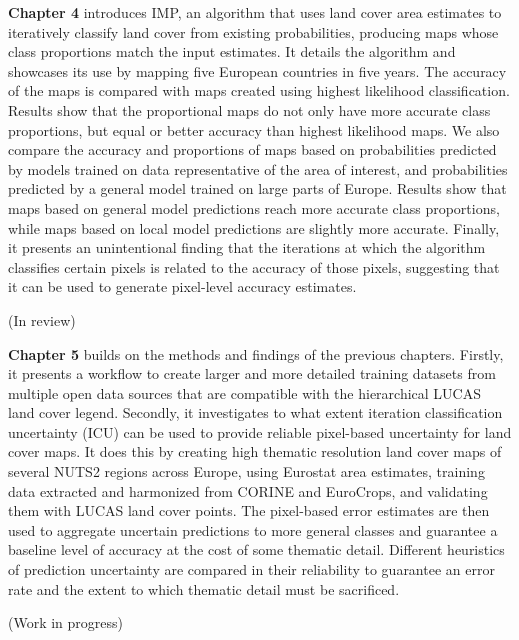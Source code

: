 
\textbf{Chapter 4} introduces IMP, an algorithm that uses land cover area estimates to iteratively classify land cover from existing probabilities, producing maps whose class proportions match the input estimates. It details the algorithm and showcases its use by mapping five European countries in five years. The accuracy of the maps is compared with maps created using highest likelihood classification. Results show that the proportional maps do not only have more accurate class proportions, but equal or better accuracy than highest likelihood maps. We also compare the accuracy and proportions of maps based on probabilities predicted by models trained on data representative of the area of interest, and probabilities predicted by a general model trained on large parts of Europe. Results show that maps based on general model predictions reach more accurate class proportions, while maps based on local model predictions are slightly more accurate. Finally, it presents an unintentional finding that the iterations at which the algorithm classifies certain pixels is related to the accuracy of those pixels, suggesting that it can be used to generate pixel-level accuracy estimates.

(In review)

\textbf{Chapter 5} builds on the methods and findings of the previous chapters. 
Firstly, it presents a workflow to create larger and more detailed training datasets from multiple open data sources that are compatible with the hierarchical LUCAS land cover legend. 
Secondly, it investigates to what extent iteration classification uncertainty (ICU) can be used to provide reliable pixel-based uncertainty for land cover maps. It does this by creating high thematic resolution land cover maps of several NUTS2 regions across Europe, using Eurostat area estimates, training data extracted and harmonized from CORINE and EuroCrops, and validating them with LUCAS land cover points. 
The pixel-based error estimates are then used to aggregate uncertain predictions to more general classes and guarantee a baseline level of accuracy at the cost of some thematic detail. Different heuristics of prediction uncertainty are compared in their reliability to guarantee an error rate and the extent to which thematic detail must be sacrificed.

(Work in progress)